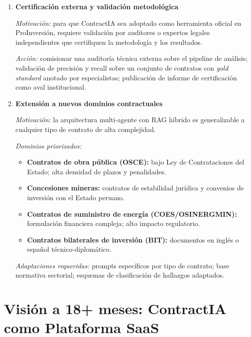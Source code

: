 \begin{enumerate}
    \textit{Diseño:} features: sector, año, concedente, tipo de APP,
    extensión, número de secciones, historial de adendas. Target:
    score de riesgo y tipos de inconsistencia más probables. Uso:
    priorización automática de contratos para revisión urgente.

    \item \textbf{Certificación externa y validación metodológica}

    \textit{Motivación:} para que ContractIA sea adoptado como herramienta
    oficial en ProInversión, requiere validación por auditores o expertos
    legales independientes que certifiquen la metodología y los resultados.

    \textit{Acción:} comisionar una auditoría técnica externa sobre el
    pipeline de análisis; validación de precisión y recall sobre un conjunto
    de contratos con \textit{gold standard} anotado por especialistas;
    publicación de informe de certificación como aval institucional.

    \item \textbf{Extensión a nuevos dominios contractuales}

    \textit{Motivación:} la arquitectura multi-agente con RAG híbrido es
    generalizable a cualquier tipo de contrato de alta complejidad.

    \textit{Dominios priorizados:}
    \begin{itemize}
        \item \textbf{Contratos de obra pública (OSCE):} bajo Ley de
        Contrataciones del Estado; alta densidad de plazos y penalidades.
        \item \textbf{Concesiones mineras:} contratos de estabilidad
        jurídica y convenios de inversión con el Estado peruano.
        \item \textbf{Contratos de suministro de energía (COES/OSINERGMIN):}
        formulación financiera compleja; alto impacto regulatorio.
        \item \textbf{Contratos bilaterales de inversión (BIT):}
        documentos en inglés o español técnico-diplomático.
    \end{itemize}

    \textit{Adaptaciones requeridas:} prompts específicos por tipo de
    contrato; base normativa sectorial; esquemas de clasificación de
    hallazgos adaptados.

\end{enumerate}

\section*{Visión a 18+ meses: ContractIA como Plataforma SaaS}

